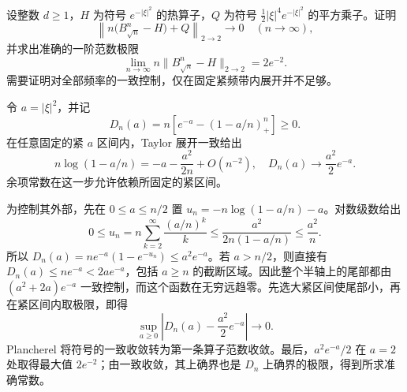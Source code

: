 \begin{exercise}\label{b2:ex:24-new-3}
设整数 \(d\geq1\)，\(H\) 为符号 \(e^{-|\xi|^2}\) 的热算子，\(Q\) 为符号 \(\tfrac12|\xi|^4e^{-|\xi|^2}\) 的平方乘子。证明
\[
 \left\|n\bigl(B_{\sqrt n}^n-H\bigr)+Q\right\|_{2\to2}
       \longrightarrow0\quad(n\to\infty),
\]
并求出准确的一阶范数极限
\[
 \lim_{n\to\infty}n\|B_{\sqrt n}^n-H\|_{2\to2}=2e^{-2}.
\]
需要证明对全部频率的一致控制，仅在固定紧频带内展开并不足够。
\end{exercise}
\begin{solution}
令 \(a=|\xi|^2\)，并记
\[
 D_n(a)=n\left[e^{-a}-(1-a/n)_+^n\right]\geq0.
\]
在任意固定的紧 \(a\) 区间内，Taylor 展开一致给出
\[
 n\log(1-a/n)=-a-\frac{a^2}{2n}+O(n^{-2}),
 \quad D_n(a)\longrightarrow\frac{a^2}2e^{-a}.
\]
余项常数在这一步允许依赖所固定的紧区间。

为控制其外部，先在 \(0\leq a\leq n/2\) 置
\(u_n=-n\log(1-a/n)-a\)。对数级数给出
\[
 0\leq u_n
 =n\sum_{k=2}^\infty\frac{(a/n)^k}{k}
 \leq\frac{a^2}{2n(1-a/n)}\leq\frac{a^2}n.
\]
所以
\(D_n(a)=ne^{-a}(1-e^{-u_n})\leq a^2e^{-a}\)。若 \(a>n/2\)，则直接有
\(D_n(a)\leq ne^{-a}<2ae^{-a}\)，包括 \(a\geq n\) 的截断区域。因此整个半轴上的尾部都由
\((a^2+2a)e^{-a}\) 一致控制，而这个函数在无穷远趋零。先选大紧区间使尾部小，再在紧区间内取极限，即得
\[
 \sup_{a\geq0}\left|D_n(a)-\frac{a^2}2e^{-a}\right|\longrightarrow0.
\]
Plancherel 将符号的一致收敛转为第一条算子范数收敛。最后，\(a^2e^{-a}/2\) 在 \(a=2\) 处取得最大值 \(2e^{-2}\)；由一致收敛，其上确界也是 \(D_n\) 上确界的极限，得到所求准确常数。
\end{solution}

